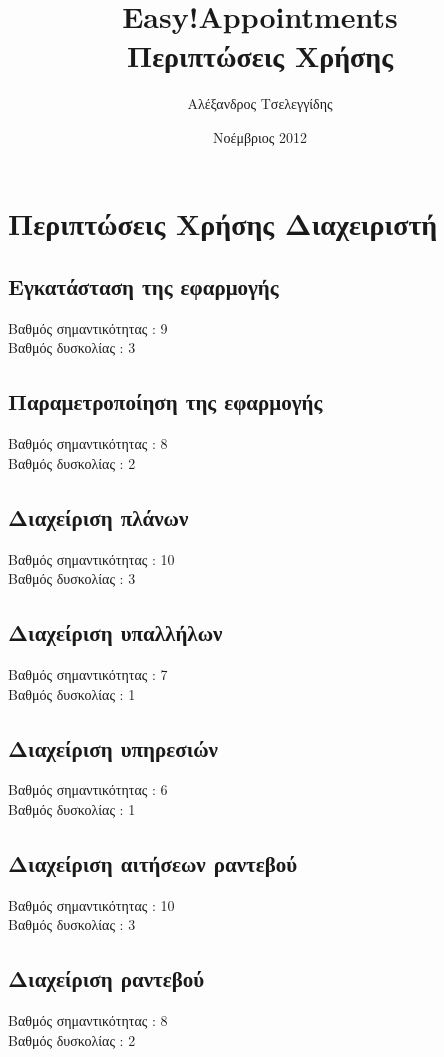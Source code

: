 \documentclass[12pt]{article}
\title{{\Huge {\bf Easy!Appointments}} \\[0.3cm] Περιπτώσεις Χρήσης}
\author{Αλέξανδρος Τσελεγγίδης}
\date{Νοέμβριος 2012}
\begin{document}
\maketitle 
\thispagestyle{empty} %
\pagebreak

\section {Περιπτώσεις Χρήσης Διαχειριστή}
\subsection{Εγκατάσταση της εφαρμογής}
Βαθμός σημαντικότητας : 9
\\[0.3cm]
Βαθμός δυσκολίας : 3

\subsection{Παραμετροποίηση της εφαρμογής}
Βαθμός σημαντικότητας : 8
\\[0.3cm]
Βαθμός δυσκολίας : 2

\subsection{Διαχείριση πλάνων}
Βαθμός σημαντικότητας : 10
\\[0.3cm]
Βαθμός δυσκολίας : 3

\subsection{Διαχείριση υπαλλήλων}
Βαθμός σημαντικότητας : 7
\\[0.3cm]
Βαθμός δυσκολίας : 1

\subsection{Διαχείριση υπηρεσιών}
Βαθμός σημαντικότητας : 6
\\[0.3cm]
Βαθμός δυσκολίας : 1

\subsection{Διαχείριση αιτήσεων ραντεβού}
Βαθμός σημαντικότητας : 10
\\[0.3cm]
Βαθμός δυσκολίας : 3

\subsection{Διαχείριση ραντεβού}
Βαθμός σημαντικότητας : 8
\\[0.3cm]
Βαθμός δυσκολίας : 2 
\end{document}
